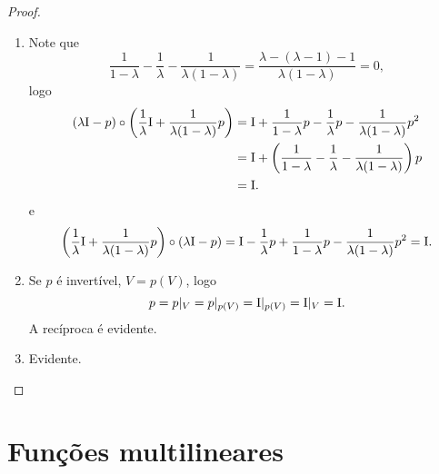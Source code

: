 \begin{proof}
\begin{enumerate}
	\item Note que
		\begin{equation*}
		\frac{1}{1-\lambda} - \frac{1}{\lambda} - \frac{1}{\lambda(1-\lambda)} = \frac{\lambda - (\lambda - 1) - 1}{\lambda(1-\lambda)} = 0,
		\end{equation*}
logo
		\begin{align*}
		(\lambda\mathrm{I} - p) \circ \left( \frac{1}{\lambda}\mathrm{I} + \frac{1}{\lambda(1-\lambda)}p \right) &= \mathrm{I} + \frac{1}{1-\lambda}p - \frac{1}{\lambda}p - \frac{1}{\lambda(1-\lambda)}p^2 \\
			&= \mathrm{I} + \left( \frac{1}{1-\lambda} - \frac{1}{\lambda} - \frac{1}{\lambda(1-\lambda)} \right) p \\
			&= \mathrm{I}.
		\end{align*}
e
	\begin{equation*}
	\left( \frac{1}{\lambda}\mathrm{I} + \frac{1}{\lambda(1-\lambda)}p \right) \circ (\lambda\mathrm{I} - p) = \mathrm{I} - \frac{1}{\lambda}p + \frac{1}{1-\lambda}p - \frac{1}{\lambda(1-\lambda)}p^2 = \mathrm{I}.
	\end{equation*}
	
	\item Se $p$ é invertível, $V=p(V)$, logo
		\begin{equation*}
		p = p|_{V} = p|_{p(V)} = \mathrm{I}|_{p(V)} = \mathrm{I}|_V = \mathrm{I}.
		\end{equation*}
A recíproca é evidente.

	\item Evidente.
	
	\end{enumerate}
\end{proof}





\section{Funções multilineares}

